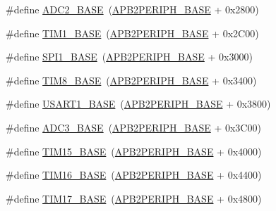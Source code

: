 \begin{DoxyCompactItemize}
\item 
\#define \mbox{\hyperlink{group___peripheral__memory__map_ga6544abc57f9759f610eee09a02442ae6}{A\+D\+C2\+\_\+\+B\+A\+SE}}~(\mbox{\hyperlink{group___peripheral__memory__map_ga25b99d6065f1c8f751e78f43ade652cb}{A\+P\+B2\+P\+E\+R\+I\+P\+H\+\_\+\+B\+A\+SE}} + 0x2800)
\item 
\#define \mbox{\hyperlink{group___peripheral__memory__map_gaf8aa324ca5011b8173ab16585ed7324a}{T\+I\+M1\+\_\+\+B\+A\+SE}}~(\mbox{\hyperlink{group___peripheral__memory__map_ga25b99d6065f1c8f751e78f43ade652cb}{A\+P\+B2\+P\+E\+R\+I\+P\+H\+\_\+\+B\+A\+SE}} + 0x2\+C00)
\item 
\#define \mbox{\hyperlink{group___peripheral__memory__map_ga50cd8b47929f18b05efbd0f41253bf8d}{S\+P\+I1\+\_\+\+B\+A\+SE}}~(\mbox{\hyperlink{group___peripheral__memory__map_ga25b99d6065f1c8f751e78f43ade652cb}{A\+P\+B2\+P\+E\+R\+I\+P\+H\+\_\+\+B\+A\+SE}} + 0x3000)
\item 
\#define \mbox{\hyperlink{group___peripheral__memory__map_ga5b72f698b7a048a6f9fcfe2efe5bc1db}{T\+I\+M8\+\_\+\+B\+A\+SE}}~(\mbox{\hyperlink{group___peripheral__memory__map_ga25b99d6065f1c8f751e78f43ade652cb}{A\+P\+B2\+P\+E\+R\+I\+P\+H\+\_\+\+B\+A\+SE}} + 0x3400)
\item 
\#define \mbox{\hyperlink{group___peripheral__memory__map_ga86162ab3f740db9026c1320d46938b4d}{U\+S\+A\+R\+T1\+\_\+\+B\+A\+SE}}~(\mbox{\hyperlink{group___peripheral__memory__map_ga25b99d6065f1c8f751e78f43ade652cb}{A\+P\+B2\+P\+E\+R\+I\+P\+H\+\_\+\+B\+A\+SE}} + 0x3800)
\item 
\#define \mbox{\hyperlink{group___peripheral__memory__map_gaca766f86c8e0b00a8e2b0224dcbb4c82}{A\+D\+C3\+\_\+\+B\+A\+SE}}~(\mbox{\hyperlink{group___peripheral__memory__map_ga25b99d6065f1c8f751e78f43ade652cb}{A\+P\+B2\+P\+E\+R\+I\+P\+H\+\_\+\+B\+A\+SE}} + 0x3\+C00)
\item 
\#define \mbox{\hyperlink{group___peripheral__memory__map_ga7ab42ce1846930569d742d339b554078}{T\+I\+M15\+\_\+\+B\+A\+SE}}~(\mbox{\hyperlink{group___peripheral__memory__map_ga25b99d6065f1c8f751e78f43ade652cb}{A\+P\+B2\+P\+E\+R\+I\+P\+H\+\_\+\+B\+A\+SE}} + 0x4000)
\item 
\#define \mbox{\hyperlink{group___peripheral__memory__map_ga16c97093a531d763b0794c3e6d09e1bf}{T\+I\+M16\+\_\+\+B\+A\+SE}}~(\mbox{\hyperlink{group___peripheral__memory__map_ga25b99d6065f1c8f751e78f43ade652cb}{A\+P\+B2\+P\+E\+R\+I\+P\+H\+\_\+\+B\+A\+SE}} + 0x4400)
\item 
\#define \mbox{\hyperlink{group___peripheral__memory__map_gaffbedbe30e8c4cffdea326d6c1800574}{T\+I\+M17\+\_\+\+B\+A\+SE}}~(\mbox{\hyperlink{group___peripheral__memory__map_ga25b99d6065f1c8f751e78f43ade652cb}{A\+P\+B2\+P\+E\+R\+I\+P\+H\+\_\+\+B\+A\+SE}} + 0x4800)

\end{DoxyCompactItemize}
